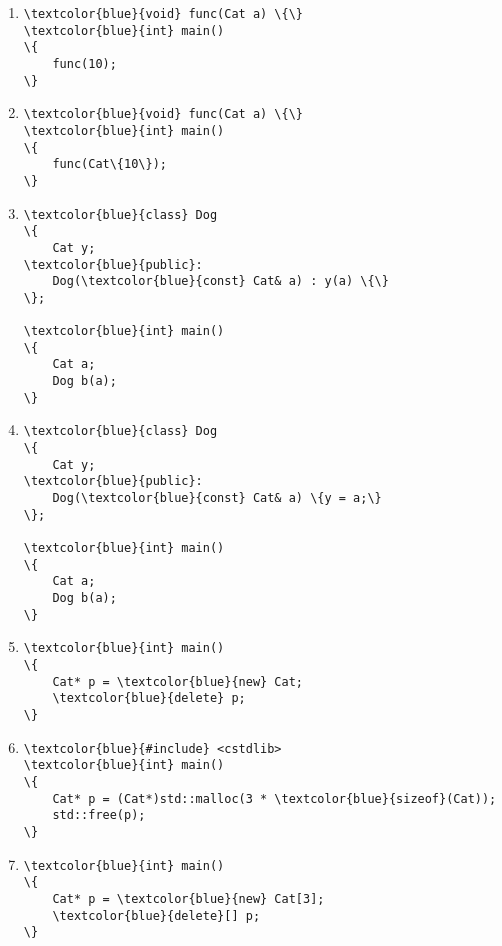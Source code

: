 \documentclass{article}
\begin{document}
\begin{enumerate}
\item \begin{Verbatim}[commandchars=\\\{\}]
\textcolor{blue}{void} func(Cat a) \{\}
\textcolor{blue}{int} main()
\{
    func(10);
\}
\end{Verbatim}

\item \begin{Verbatim}[commandchars=\\\{\}]
\textcolor{blue}{void} func(Cat a) \{\}
\textcolor{blue}{int} main()
\{
    func(Cat\{10\});
\}
\end{Verbatim}

\item \begin{Verbatim}[commandchars=\\\{\}]
\textcolor{blue}{class} Dog
\{
    Cat y;
\textcolor{blue}{public}:
    Dog(\textcolor{blue}{const} Cat& a) : y(a) \{\}
\};

\textcolor{blue}{int} main()
\{
    Cat a;
    Dog b(a);
\}
\end{Verbatim}

\item \begin{Verbatim}[commandchars=\\\{\}]
\textcolor{blue}{class} Dog
\{
    Cat y;
\textcolor{blue}{public}:
    Dog(\textcolor{blue}{const} Cat& a) \{y = a;\}
\};

\textcolor{blue}{int} main()
\{
    Cat a;
    Dog b(a);
\}
\end{Verbatim}

\item \begin{Verbatim}[commandchars=\\\{\}]
\textcolor{blue}{int} main()
\{
    Cat* p = \textcolor{blue}{new} Cat;
    \textcolor{blue}{delete} p;
\}
\end{Verbatim}

\item \begin{Verbatim}[commandchars=\\\{\}]
\textcolor{blue}{#include} <cstdlib>
\textcolor{blue}{int} main()
\{
    Cat* p = (Cat*)std::malloc(3 * \textcolor{blue}{sizeof}(Cat));
    std::free(p);
\}
\end{Verbatim}

\item \begin{Verbatim}[commandchars=\\\{\}]
\textcolor{blue}{int} main()
\{
    Cat* p = \textcolor{blue}{new} Cat[3];
    \textcolor{blue}{delete}[] p;
\}
\end{Verbatim}


\end{enumerate}
\end{document}
